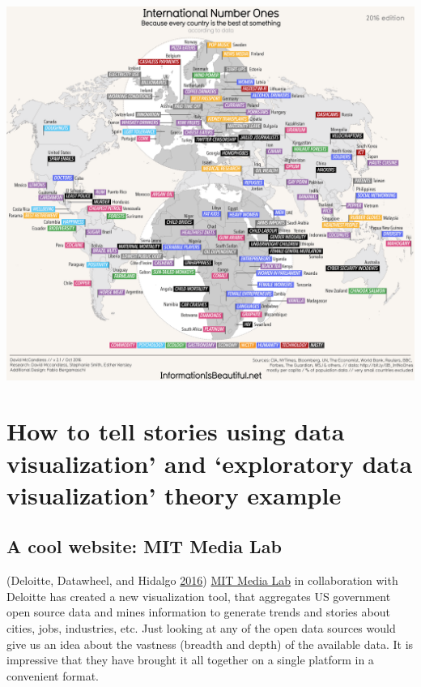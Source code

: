\documentclass[]{book}
\begin{document}
\includegraphics{images/Number_ones.png}

\hypertarget{how-to-tell-stories-using-data-visualization-and-exploratory-data-visualization-theory-example}{%
\section{How to tell stories using data visualization' and `exploratory data visualization' theory example}\label{how-to-tell-stories-using-data-visualization-and-exploratory-data-visualization-theory-example}}

\hypertarget{a-cool-website-mit-media-lab}{%
\subsection{A cool website: MIT Media Lab}\label{a-cool-website-mit-media-lab}}

(Deloitte, Datawheel, and Hidalgo \protect\hyperlink{ref-DataUSA}{2016})
\href{https://www.media.mit.edu}{MIT Media Lab} in collaboration with Deloitte has created a new visualization tool, that aggregates US government open source data and mines information to generate trends and stories about cities, jobs, industries, etc.
Just looking at any of the open data sources would give us an idea about the vastness (breadth and depth) of the available data. It is impressive that they have brought it all together on a single platform in a convenient format.
\end{document}
